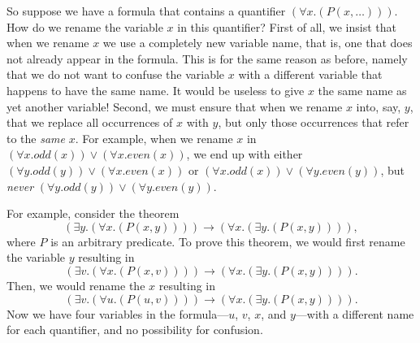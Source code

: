 So suppose we have a formula that contains a quantifier $(\forall x.(P(x, \dots)))$. How do we rename the variable $x$ in 
this quantifier? First of all, we insist that when we rename $x$ we use a completely new variable name, that is, one that does
not already appear in the formula. This is for the same reason as before, namely that we do not want to confuse the variable
$x$ with a different variable that happens to have the same name. It would be useless to give $x$ the same name as yet another
variable! Second, we must ensure that when we rename $x$ into, say, $y$, that we replace all occurrences of $x$ with $y$, but
only those occurrences that refer to the \emph{same} $x$. For example, when we rename $x$ in 
$(\forall x.odd(x)) \vee (\forall x.even(x))$, we end up with either
$(\forall y.odd(y)) \vee (\forall x.even(x))$ or
$(\forall x.odd(x)) \vee (\forall y.even(y))$, but \emph{never}
$(\forall y.odd(y)) \vee (\forall y.even(y))$.

For example, consider the theorem 
$$(\exists y. (\forall x. (P(x, y)))) \rightarrow (\forall x. (\exists y. (P(x, y)))),$$
where $P$ is an arbitrary predicate. To prove this theorem, we would first rename the variable $y$ resulting in
$$(\exists v. (\forall x. (P(x, v)))) \rightarrow (\forall x. (\exists y. (P(x, y)))).$$
Then, we would rename the $x$ resulting in
$$(\exists v. (\forall u. (P(u, v)))) \rightarrow (\forall x. (\exists y. (P(x, y)))).$$
Now we have four variables in the formula---$u$, $v$, $x$, and $y$---with a different name for each quantifier, and no
possibility for confusion.

